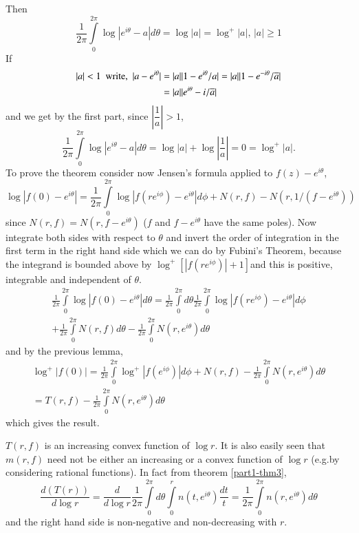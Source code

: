 Then
$$
\frac{1}{2\pi}\int\limits^{2\pi}_{0}\log
|e^{i\theta}-a|d\theta=\log|a|=\log^{+}|a|, \,|a|\geq 1
$$
If
\begin{align*}
|a|<1 \text{ \  write, \ } |a-e^{i\theta}| &=
|a||1-e^{i\theta}/a|=|a||1-e^{-i\theta}/\overline{a}|\\
&= |a||e^{i\theta}-i/\overline{a}|
\end{align*}
and we get by the first part, since $\left|\dfrac{1}{a}\right|>1$,
$$
\frac{1}{2\pi}\int\limits^{2\pi}_{0}\log| e^{i\theta}-a|d\theta =
\log|a|+\log\left|\frac{1}{a}\right|=0=\log^{+}|a|.  
$$
To prove the theorem consider now Jensen's formula applied to
$f(z)-e^{i\theta}$, 
$$
\log|f(0)-e^{i\theta}| = \frac{1}{2\pi} \int\limits^{2\pi}_{0}
\log|f(re^{i\phi})-e^{i\theta}|d\phi+N(r,f)-N(r,1/(f-e^{i\theta}))  
$$
since $N(r,f)=N(r,f-e^{i\theta})$ ($f$ and $f-e^{i\theta}$ have the
same poles). Now integrate both sides with respect to $\theta$ and
invert the order of integration in the first term in the right hand
side which we can do by Fubini's Theorem, because the integrand is
bounded above by $\log^{+}[|f(re^{i\phi})|+1]$\pageoriginale and this
is positive, integrable and independent of $\theta$.
\begin{gather*}
\frac{1}{2\pi}\int\limits^{2\pi}_{0}\log|f(0)-e^{i\theta}|d\theta=\frac{1}{2\pi}\int\limits^{2\pi}_{0}d\theta\frac{1}{2\pi}\int\limits^{2\pi}_{0}\log
|f(re^{i\phi})-e^{i\theta}|d\phi\\
+\frac{1}{2\pi}\int\limits^{2\pi}_{0}N(r,f)d\theta-\frac{1}{2\pi}\int\limits^{2\pi}_{0}N(r,e^{i\theta})d\theta 
\end{gather*}
and by the previous lemma,
\begin{gather*}
\log^{+}|f(0)|=\frac{1}{2\pi}\int\limits^{2\pi}_{0}\log^{+}|f(e^{i\phi})|d\phi+N(r,f)-\frac{1}{2\pi}\int\limits^{2\pi}_{0}N(r,e^{i\theta})d\theta\\
=T(r,f)-\frac{1}{2\pi}\int\limits^{2\pi}_{0}N(r,e^{i\theta})d\theta 
\end{gather*}
which gives the result.

\begin{cor}\label{part1-coro1}
$T(r,f)$ is an increasing convex function of $\log r$. It is also
  easily seen that $m(r,f)$ need not be either an increasing or a
  convex function of $\log r$ (e.g.\@ by considering rational
  functions). In fact from theorem \ref{part1-thm3},
$$ 
\frac{d(T(r))}{d\log r}=\frac{d}{d\log
  r}\frac{1}{2\pi}\int\limits^{2\pi}_{0} d\theta \int\limits^{r}_{0}
n(t,e^{i\theta})\frac{dt}{t} = \frac{1}{2\pi} \int\limits^{2\pi}_{0}
n(r,e^{i\theta})d\theta   
$$
and the right hand side is non-negative and non-decreasing with $r$.
\end{cor}

